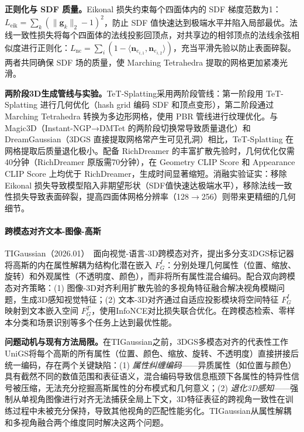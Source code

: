 \textbf{正则化与 SDF 质量。}Eikonal 损失约束每个四面体内的 SDF 梯度范数为1：$L_{\text{eik}} = \sum_k (\|\mathbf{g}_k\|_2 - 1)^2$，防止 SDF 值快速达到极端水平并陷入局部最优。法线一致性损失将每个四面体的法线投影回顶点，对共享边的相邻顶点的法线余弦相似度进行正则化：$L_{\text{nc}} = \sum_i (1 - \langle \mathbf{n}_{e_{i,1}}, \mathbf{n}_{e_{i,2}} \rangle)$，充当平滑先验以防止表面碎裂。两者共同确保 SDF 场的质量，使 Marching Tetrahedra 提取的网格更加紧凑光滑。

\textbf{两阶段3D生成管线与实验。}TeT-Splatting采用两阶段管线：第一阶段用 TeT-Splatting 进行几何优化（hash grid 编码 SDF 和顶点变形），第二阶段通过 Marching Tetrahedra 转换为多边形网格，使用 PBR 管线进行纹理优化。与 Magic3D（Instant-NGP→DMTet 的两阶段切换常导致质量退化）和 DreamGaussian（3DGS 直接提取网格常产生可见孔洞）相比，TeT-Splatting 在网格提取后质量退化极小。配备 RichDreamer 的丰富扩散先验时，几何优化仅需40分钟（RichDreamer 原版需70分钟），在 Geometry CLIP Score 和 Appearance CLIP Score 上均优于 RichDreamer，生成时间显著缩短。消融实验证实：移除 Eikonal 损失导致模型陷入非期望形状（SDF值快速达极端水平），移除法线一致性损失导致表面碎裂，提高四面体网格分辨率（128$\to$256）则带来更精细的几何细节。

\paragraph{跨模态对齐文本-图像-高斯}

TIGaussian（2026.01）~\cite{2601_19247}面向视觉-语言-3D跨模态对齐，提出多分支3DGS标记器将高斯的内在属性解耦为结构化潜在嵌入 $F_G^I$：分别处理几何属性（位置、缩放、旋转）和外观属性（不透明度、颜色），而非将所有属性混合编码。配合双向跨模态对齐策略：(1) 图像-3D对齐利用扩散先验的多视角特征融合解决视角模糊问题，生成3D感知视觉特征；(2) 文本-3D对齐通过自适应投影模块将空间特征 $F_G^I$ 映射到文本嵌入空间 $F_G^T$，使用InfoNCE对比损失联合优化。在跨模态检索、零样本分类和场景识别等多个任务上达到最优性能。

\textbf{问题动机与现有方法局限。}在TIGaussian之前，3DGS多模态对齐的代表性工作UniGS将每个高斯的所有属性（位置、颜色、缩放、旋转、不透明度）直接拼接后统一编码，存在两个关键缺陷：(1) \emph{属性纠缠编码}——异质属性（如位置与颜色）具有截然不同的数值范围和表征语义，混合编码导致信息瓶颈下各属性的特异性信号被压缩，无法充分挖掘高斯属性的分布模式和几何意义；(2) \emph{退化3D感知}——强制从单视角图像进行对齐无法捕获全局上下文，3D特征表征的跨视角一致性在训练过程中未被充分保持，导致其他视角的匹配性能劣化。TIGaussian从属性解耦和多视角融合两个维度同时解决这两个问题。

